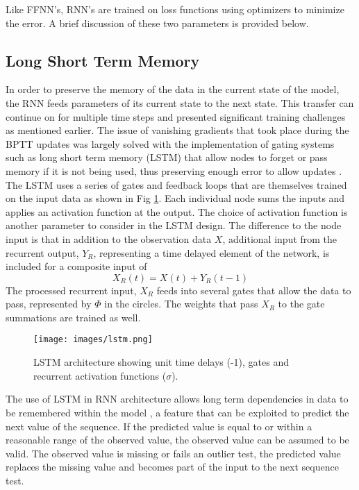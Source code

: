 \documentclass[preprint,12pt,authoryear]{elsarticle}
\begin{document}
\begin{linenumbers}
Like FFNN's, RNN's are trained on loss functions using optimizers to minimize the error. A brief discussion of these two parameters is provided below.

\subsection{Long Short Term Memory}

In order to preserve the memory of the data in the current state of the model, the RNN feeds parameters of its current state to the next state. This transfer can continue on for multiple time steps and presented significant training challenges as mentioned earlier. The issue of vanishing gradients that took place during the BPTT updates was largely solved with the implementation of gating systems such as long short term memory (LSTM) that allow nodes to forget or pass memory if it is not being used, thus preserving enough error to allow updates \citep{Hochreiter1997}. The LSTM uses a series of gates and feedback loops that are themselves trained on the input data as shown in Fig \ref{fig:lstm}. Each individual node sums the inputs and applies an activation function at the output. The choice of activation function is another parameter to consider in the LSTM design. The difference to the node input is that in addition to the observation data $X$, additional input from the recurrent output, $Y_{R}$, representing a time delayed element of the network, is included for a composite input of 
%
\begin{equation}
\label{eq:Xr}
X_{R}(t) = X(t) + Y_{R}(t-1)
\end{equation}
%
The processed recurrent input, $X_{R}$ feeds into several gates that allow the data to pass, represented by $\Phi$ in the circles. The weights that pass $X_{R}$ to the gate summations are trained as well.
%
\begin{figure}[H]
\centering
\texttt{[image: images/lstm.png]} 
\caption{LSTM architecture showing unit time delays (-1), gates and recurrent activation functions ($\sigma$).}
\label{fig:lstm}
\end{figure}
%
The use of LSTM in RNN architecture allows long term dependencies in data to be remembered within the model \citep{Graves2013a}, a feature that can be exploited to predict the next value of the sequence. If the predicted value is equal to or within a reasonable range of the observed value, the observed value can be assumed to be valid. The observed value is missing or fails an outlier test, the predicted value replaces the missing value and becomes part of the input to the next sequence test.


\end{linenumbers}
\end{document}
